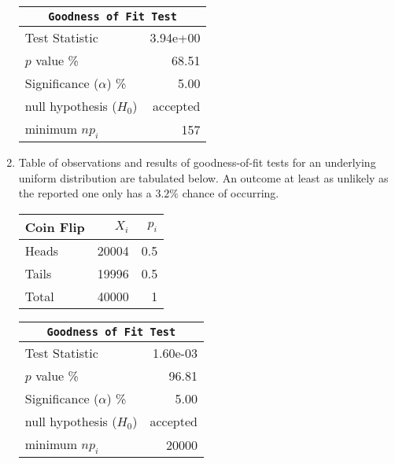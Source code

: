 \begin{enumerate}
\begin{table}[H]
\begin{minipage}{0.4\textwidth}
		\end{minipage}
		\begin{minipage}{0.4\textwidth}
			\centering
			\begin{tabular}{@{}lr@{}}
				\toprule
				\multicolumn{2}{c}{\texttt{Goodness of Fit Test}} \\
				\midrule
				Test Statistic             &  3.94e+00 \\
				$p$ value \%               &     68.51 \\
				Significance ($\alpha$) \% &      5.00 \\
				null hypothesis ($H_0$)    &  accepted \\
				minimum $n p_i$            &       157 \\
				\bottomrule
			\end{tabular}
			
		\end{minipage}
	\end{table}
	\bigskip
	
	\item Table of observations and results of goodness-of-fit tests for an underlying uniform distribution are tabulated below. An outcome at least as unlikely as the reported one only has a $ 3.2\% $ chance of occurring.
	
	\begin{table}[H]
		\centering
		\begin{minipage}{0.4\textwidth}
			\centering
			\begin{tabular}{@{}lrr@{}}
				\toprule
				Coin Flip &  $X_i$ & $p_i$ \\
				\midrule
				Heads &  20004 &   0.5 \\
				Tails &  19996 &   0.5 \\
				\midrule
				Total &  40000 &     1 \\
				\bottomrule
			\end{tabular}
			
		\end{minipage}
		\begin{minipage}{0.4\textwidth}
			\centering
			\begin{tabular}{@{}lr@{}}
				\toprule
				\multicolumn{2}{c}{\texttt{Goodness of Fit Test}} \\
				\midrule
				Test Statistic             &  1.60e-03 \\
				$p$ value \%               &     96.81 \\
				Significance ($\alpha$) \% &      5.00 \\
				null hypothesis ($H_0$)    &  accepted \\
				minimum $n p_i$            &     20000 \\
				\bottomrule
			\end{tabular}
			

\end{minipage}
\end{table}
\end{enumerate}
